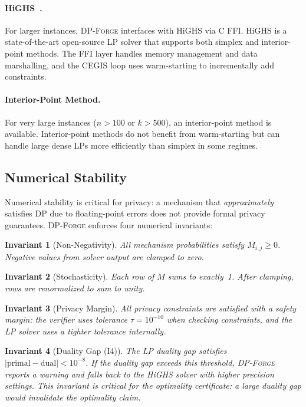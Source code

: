 \documentclass[11pt,a4paper]{article}
\newcommand{\dpforge}{\textsc{DP-Forge}}
\newtheorem{invariant}{Invariant}
\begin{document}
\paragraph{HiGHS~\cite{huangfu2018parallelizing}.}
For larger instances, \dpforge{} interfaces with HiGHS via C FFI.  HiGHS is a
state-of-the-art open-source LP solver that supports both simplex and interior-point
methods.  The FFI layer handles memory management and data marshalling, and the
CEGIS loop uses warm-starting to incrementally add constraints.

\paragraph{Interior-Point Method.}
For very large instances ($n > 100$ or $k > 500$), an interior-point method is
available.  Interior-point methods do not benefit from warm-starting but can
handle large dense LPs more efficiently than simplex in some regimes.

\subsection{Numerical Stability}
\label{subsec:numerical}

Numerical stability is critical for privacy: a mechanism that \emph{approximately}
satisfies DP due to floating-point errors does not provide formal privacy
guarantees.  \dpforge{} enforces four numerical invariants:

\begin{invariant}[Non-Negativity]
\label{inv:nonneg}
All mechanism probabilities satisfy $M_{i,j} \ge 0$.  Negative values from
solver output are clamped to zero.
\end{invariant}

\begin{invariant}[Stochasticity]
\label{inv:stochastic}
Each row of $M$ sums to exactly~1.  After clamping, rows are renormalized to
sum to unity.
\end{invariant}

\begin{invariant}[Privacy Margin]
\label{inv:privacy}
All privacy constraints are satisfied with a safety margin: the verifier uses
tolerance $\tau = 10^{-10}$ when checking constraints, and the LP solver uses
a tighter tolerance internally.
\end{invariant}

\begin{invariant}[Duality Gap (I4)]
\label{inv:duality}
The LP duality gap satisfies $|\text{primal} - \text{dual}| < 10^{-8}$.  If the
duality gap exceeds this threshold, \dpforge{} reports a warning and falls back
to the HiGHS solver with higher precision settings.  This invariant is critical
for the optimality certificate: a large duality gap would invalidate the
optimality claim.
\end{invariant}
\end{document}
